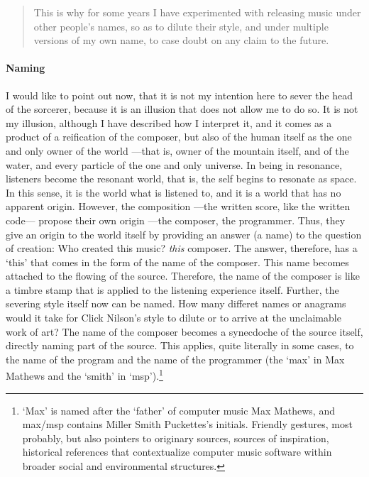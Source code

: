 \begin{quote}
	This is why for some years I have experimented with releasing music under other people's names, so as to dilute their style, and under multiple versions of my own name, to case doubt on any claim to the future. \parencite{Col15:Col}
\end{quote}

\paragraph{Naming}
I would like to point out now, that it is not my intention here to sever the head of the sorcerer, because it is an illusion that does not allow me to do so. It is not my illusion, although I have described how I interpret it, and it comes as a product of a reification of the composer, but also of the human itself as the one and only owner of the world ---that is, owner of the mountain itself, and of the water, and every particle of the one and only universe. In being in resonance, listeners become the resonant world, that is, the self begins to resonate as space. In this sense, it is the world what is listened to, and it is a world that has no apparent origin. However, the composition ---the written score, like the written code--- propose their own origin ---the composer, the programmer. Thus, they give an origin to the world itself by providing an answer (a name) to the question of creation: Who created this music? \textit{this} composer. The answer, therefore, has a `this' that comes in the form of the name of the composer. This name becomes attached to the flowing of the source. Therefore, the name of the composer is like a timbre stamp that is applied to the listening experience itself. Further, the severing style itself now can be named. How many differet names or anagrams would it take for Click Nilson's style to dilute or to arrive at the unclaimable work of art? The name of the composer becomes a synecdoche of the source itself, directly naming part of the source. This applies, quite literally in some cases, to the name of the program and the name of the programmer (the `max' in Max Mathews and the `smith' in `msp').\footnote{`Max' is named after the `father' of computer music Max Mathews, and \gls{max/msp} contains Miller Smith Puckettes's initials. Friendly gestures, most probably, but also pointers to originary sources, sources of inspiration, historical references that contextualize computer music software within broader social and environmental structures.}

